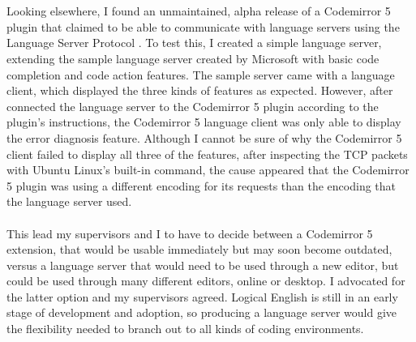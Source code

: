 \documentclass[../main.tex]{subfiles}
\begin{document}
\\
\\
Looking elsewhere, I found an unmaintained, alpha release of a Codemirror 5 plugin that claimed to be able to communicate with language servers using the Language Server Protocol \cite{lsp_editor_adapter}. To test this, I created a simple language server, extending the sample language server created by Microsoft \cite{lsp_sample_server} with basic code completion and code action features. The sample server came with a language client, which displayed the three kinds of features as expected. However, after connected the language server to the Codemirror 5 plugin according to the plugin's instructions, the Codemirror 5 language client was only able to display the error diagnosis feature. Although I cannot be sure of why the Codemirror 5 client failed to display all three of the features, after inspecting the TCP packets with Ubuntu Linux's built-in  command, the cause appeared that the Codemirror 5 plugin was using a different encoding for its requests than the encoding that the language server used.
\\
\\
This lead my supervisors and I to have to decide between a Codemirror 5 extension, that would be usable immediately but may soon become outdated, versus a language server that would need to be used through a new editor, but could be used through many different editors, online or desktop. I advocated for the latter option and my supervisors agreed. Logical English is still in an early stage of development and adoption, so producing a language server would give the flexibility needed to branch out to all kinds of coding environments.
\end{document}
